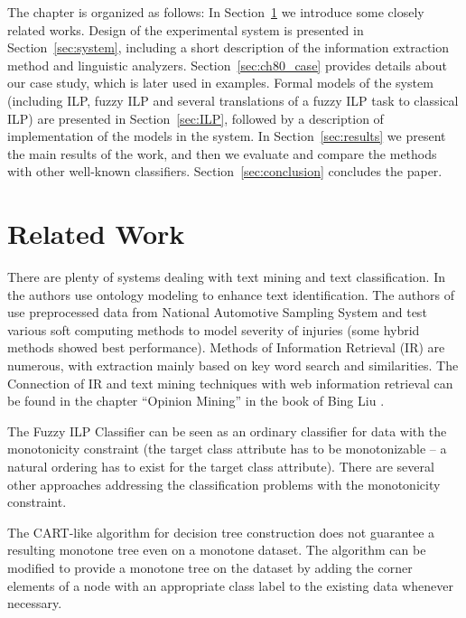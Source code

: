 The chapter is organized as follows: In Section~\ref{sec:related} we introduce some closely related works. Design of the experimental system is presented in Section~\ref{sec:system}, including a short description of the information extraction method and linguistic analyzers. Section~\ref{sec:ch80_case} provides details about our case study, which is later used in examples. Formal models of the system (including ILP, fuzzy ILP and several translations of a fuzzy ILP task to classical ILP) are presented in Section~\ref{sec:ILP}, followed by a description of implementation of the models in the system. In Section~\ref{sec:results} we present the main results of the work, and then we evaluate and compare the methods with other well-known classifiers. Section~\ref{sec:conclusion} concludes the paper.

 


\section{Related Work} \label{sec:related}

There are plenty of systems dealing with text mining and text classification. In \citep{biblio:ReYaLiOntoText08} the authors use ontology modeling to enhance text identification. The authors of \citep{biblio:CAP} use preprocessed data from National Automotive Sampling System and test various soft computing methods to model severity of injuries (some hybrid methods showed best performance). Methods of Information Retrieval (IR) are numerous, with extraction mainly based on key word search and similarities. The Connection of IR and text mining techniques with web information retrieval can be found in the chapter ``Opinion Mining'' in the book of Bing Liu \citep{biblio:WebDataMining}. 

The Fuzzy ILP Classifier can be seen as an ordinary classifier for data with the monotonicity constraint (the target class attribute has to be monotonizable -- a natural ordering has to exist for the target class attribute). There are several other approaches addressing the classification problems with the monotonicity constraint.

The CART-like algorithm for decision tree construction does not guarantee a resulting monotone tree even on a monotone dataset. The algorithm can be modified \citep{biblio:mon_trees} to provide a monotone tree on the dataset by adding the corner elements of a node with an appropriate class label to the existing data whenever necessary.

